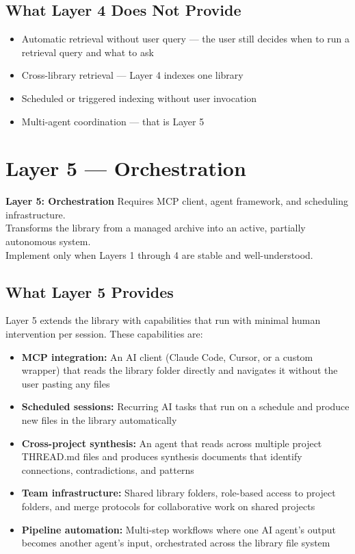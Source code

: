 \documentclass[12pt,letterpaper]{article}
\begin{document}
\subsection{What Layer 4 Does Not Provide}

\begin{itemize}
  \item Automatic retrieval without user query --- the user still decides
        when to run a retrieval query and what to ask
  \item Cross-library retrieval --- Layer 4 indexes one library
  \item Scheduled or triggered indexing without user invocation
  \item Multi-agent coordination --- that is Layer 5
\end{itemize}

\section{Layer 5 --- Orchestration}

\begin{layerbox5}
\textbf{Layer 5: Orchestration} \quad Requires MCP client, agent framework, and scheduling infrastructure.\\
Transforms the library from a managed archive into an active, partially autonomous system.\\
Implement only when Layers 1 through 4 are stable and well-understood.
\end{layerbox5}

\subsection{What Layer 5 Provides}

Layer 5 extends the library with capabilities that run with minimal
human intervention per session. These capabilities are:

\begin{itemize}
  \item \textbf{MCP integration:} An AI client (Claude Code, Cursor, or
        a custom wrapper) that reads the library folder directly and
        navigates it without the user pasting any files
  \item \textbf{Scheduled sessions:} Recurring AI tasks that run on a
        schedule and produce new files in the library automatically
  \item \textbf{Cross-project synthesis:} An agent that reads across
        multiple project THREAD.md files and produces synthesis documents
        that identify connections, contradictions, and patterns
  \item \textbf{Team infrastructure:} Shared library folders, role-based
        access to project folders, and merge protocols for collaborative
        work on shared projects
  \item \textbf{Pipeline automation:} Multi-step workflows where one
        AI agent's output becomes another agent's input, orchestrated
        across the library file system
\end{itemize}
\end{document}
